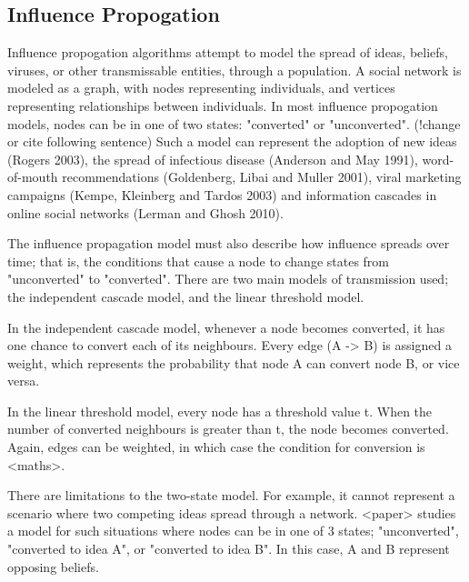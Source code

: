 \subsection{Influence Propogation}

 Influence propogation algorithms attempt to model the spread of ideas, beliefs, viruses, or other transmissable entities, through a population. A social network is modeled as a graph, with nodes representing individuals, and vertices representing relationships between individuals. In most influence propogation models, nodes can be in one of two states: "converted" or "unconverted". (!change or cite following sentence) Such a model can represent the adoption of new ideas (Rogers 2003), the spread of infectious disease (Anderson and May 1991), word-of-mouth recommendations (Goldenberg, Libai and Muller 2001), viral marketing campaigns (Kempe, Kleinberg and Tardos 2003) and information cascades in online social networks (Lerman and Ghosh 2010).

 The influence propagation model must also describe how influence spreads over time; that is, the conditions that cause a node to change states from "unconverted" to "converted". There are two main models of transmission used; the independent cascade model, and the linear threshold model.

 In the independent cascade model, whenever a node becomes converted, it has one chance to convert each of its neighbours. Every edge (A -> B) is assigned a weight, which represents the probability that node A can convert node B, or vice versa.

 In the linear threshold model, every node has a threshold value t. When the number of converted neighbours is greater than t, the node becomes converted. Again, edges can be weighted, in which case the condition for conversion is <maths>.

 There are limitations to the two-state model. For example, it cannot represent a scenario where two competing ideas spread through a network. <paper> studies a model for such situations where nodes can be in one of 3 states; "unconverted", "converted to idea A", or "converted to idea B". In this case, A and B represent opposing beliefs.
